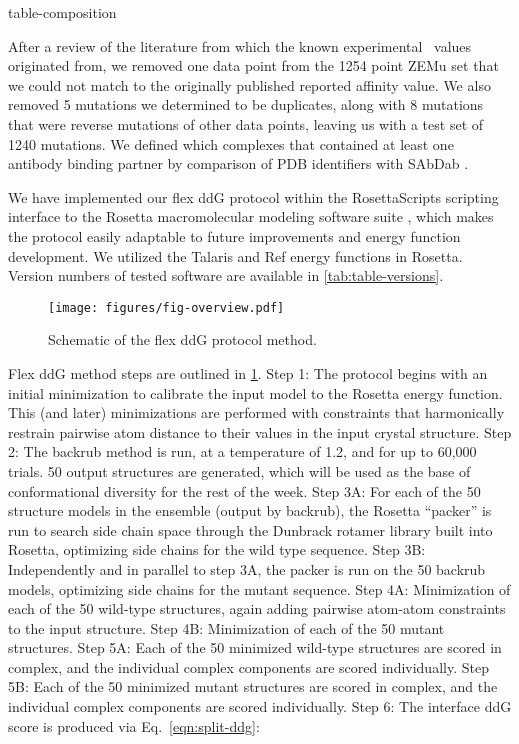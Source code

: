 {table-composition}

After a review of the literature from which the known experimental \ddg\ values originated from, we removed one data point from the 1254 point ZEMu set that we could not match to the originally published reported affinity value. We also removed 5 mutations we determined to be duplicates, along with 8 mutations that were reverse mutations of other data points, leaving us with a test set of 1240 mutations.
We defined which complexes that contained at least one antibody binding partner by comparison of PDB identifiers with SAbDab \cite{dunbar_sabdab:_2014}.

We have implemented our flex ddG protocol within the RosettaScripts scripting interface to the Rosetta macromolecular modeling software suite \cite{fleishman_rosettascripts:_2011}, which makes the protocol easily adaptable to future improvements and energy function development. We utilized the Talaris \cite{leaver-fay_chapter_2013,song_structure-guided_2011,shapovalov_smoothed_2011} and Ref\cite{alford_rosetta_2017} energy functions in Rosetta. Version numbers of tested software are available in \cref{tab:table-versions}.

\begin{figure}
  \centering
  \texttt{[image: figures/fig-overview.pdf]}
    \caption{
      Schematic of the flex ddG protocol method.
  } \label{fig:figure-overview}
\end{figure}

Flex ddG method steps are outlined in \cref{fig:figure-overview}. Step 1: The protocol begins with an initial minimization to calibrate the input model to the Rosetta energy function. This (and later) minimizations are performed with constraints that harmonically restrain pairwise atom distance to their values in the input crystal structure. Step 2: The backrub method is run, at a temperature of 1.2, and for up to 60,000 trials. 50 output structures are generated, which will be used as the base of conformational diversity for the rest of the week. Step 3A: For each of the 50 structure models in the ensemble (output by backrub), the Rosetta ``packer'' is run to search side chain space through the Dunbrack rotamer library built into Rosetta\cite{shapovalov_smoothed_2011}, optimizing side chains for the wild type sequence. Step 3B: Independently and in parallel to step 3A, the packer is run on the 50 backrub models, optimizing side chains for the mutant sequence. Step 4A: Minimization of each of the 50 wild-type structures, again adding pairwise atom-atom constraints to the input structure. Step 4B: Minimization of each of the 50 mutant structures. Step 5A: Each of the 50 minimized wild-type structures are scored in complex, and the individual complex components are scored individually. Step 5B: Each of the 50 minimized mutant structures are scored in complex, and the individual complex components are scored individually. Step 6: The interface ddG score is produced via Eq.~\ref{eqn:split-ddg}:

